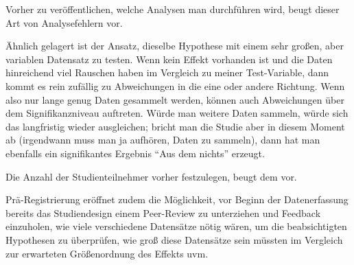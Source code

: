 Vorher zu veröffentlichen, welche Analysen man durchführen wird, beugt dieser Art von Analysefehlern vor.

\smallskip
Ähnlich gelagert ist der Ansatz, dieselbe Hypothese mit einem sehr großen, aber variablen Datensatz zu testen. Wenn kein Effekt vorhanden ist und die Daten hinreichend viel Rauschen haben im Vergleich zu meiner Test-Variable, dann kommt es rein zufällig zu Abweichungen in die eine oder andere Richtung. Wenn also nur lange genug Daten gesammelt werden, können auch Abweichungen über dem Signifikanzniveau auftreten. Würde man weitere Daten sammeln, würde sich das langfristig wieder ausgleichen; bricht man die Studie aber in diesem Moment ab (irgendwann muss man ja aufhören, Daten zu sammeln), dann hat man ebenfalls ein signifikantes Ergebnis \enquote{Aus dem nichts} erzeugt.

Die Anzahl der Studienteilnehmer vorher festzulegen, beugt dem vor.

\smallskip
Prä-Registrierung eröffnet zudem die Möglichkeit, vor Beginn der Datenerfassung bereits das Studiendesign einem Peer-Review zu unterziehen und Feedback einzuholen, wie viele verschiedene Datensätze nötig wären, um die beabsichtigten Hypothesen zu überprüfen, wie groß diese Datensätze sein müssten im Vergleich zur erwarteten Größenordnung des Effekts uvm.